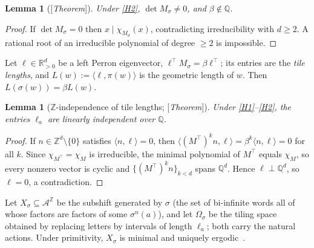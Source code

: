 \documentclass[11pt]{amsart}
\theoremstyle{plain}
\newtheorem{lemma}[theorem]{Lemma}
\theoremstyle{definition}
\theoremstyle{remark}
\newcommand{\Z}{\mathbb{Z}}
\newcommand{\Q}{\mathbb{Q}}
\newcommand{\R}{\mathbb{R}}
\newcommand{\A}{\mathcal{A}}
\newcommand{\Status}[1]{\textup{[\textit{#1}]}}
\begin{document}
\begin{lemma}[\Status{Theorem}]\label{lem:det}
Under \ref{H2}, $\det M_\sigma\ne0$, and $\beta\notin\Q$.
\end{lemma}
\begin{proof}
If $\det M_\sigma=0$ then $x\mid\chi_{M_\sigma}(x)$, contradicting irreducibility with $d\ge2$. A rational root of an irreducible polynomial of degree $\ge2$ is impossible.
\end{proof}

Let $\ell\in\R^d_{>0}$ be a left Perron eigenvector, $\ell^{\top}M_\sigma=\beta\ell^{\top}$; its entries are the \emph{tile lengths}, and $L(w):=\langle\ell,\pi(w)\rangle$ is the geometric length of $w$. Then $L(\sigma(w))=\beta L(w)$.

\begin{lemma}[$\Z$-independence of tile lengths; \Status{Theorem}]\label{lem:Zindep}
Under \ref{H1}--\ref{H2}, the entries $\ell_a$ are linearly independent over $\Q$.
\end{lemma}
\begin{proof}
If $n\in\Z^d\setminus\{0\}$ satisfies $\langle n,\ell\rangle=0$, then $\langle (M^{\top})^kn,\ell\rangle=\beta^k\langle n,\ell\rangle=0$ for all $k$. Since $\chi_{M^\top}=\chi_M$ is irreducible, the minimal polynomial of $M^\top$ equals $\chi_M$, so every nonzero vector is cyclic and $\{(M^\top)^kn\}_{k<d}$ spans $\Q^d$. Hence $\ell\perp\Q^d$, so $\ell=0$, a contradiction.
\end{proof}

Let $X_\sigma\subseteq\A^{\Z}$ be the subshift generated by $\sigma$ (the set of bi-infinite words all of whose factors are factors of some $\sigma^n(a)$), and let $\Omega_\sigma$ be the tiling space obtained by replacing letters by intervals of length $\ell_a$; both carry the natural actions. Under primitivity, $X_\sigma$ is minimal and uniquely ergodic~\cite{Queffelec}.
\end{document}
